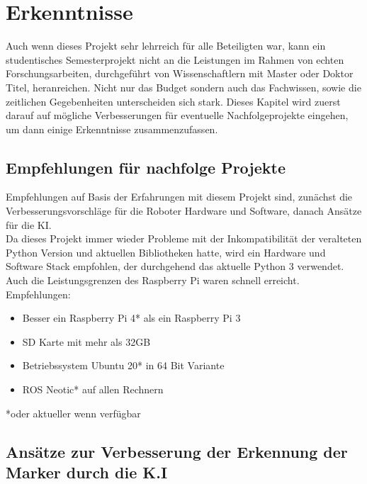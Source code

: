 \documentclass[conference]{IEEEtran}
\begin{document}

	\section{Erkenntnisse }
	Auch wenn dieses Projekt sehr lehrreich für alle Beteiligten war, kann ein studentisches Semesterprojekt nicht an die Leistungen im Rahmen von echten Forschungsarbeiten, durchgeführt von Wissenschaftlern mit Master oder Doktor Titel, heranreichen. Nicht nur das Budget sondern auch das Fachwissen, sowie die zeitlichen Gegebenheiten unterscheiden sich stark. Dieses Kapitel wird zuerst darauf auf mögliche Verbesserungen für eventuelle Nachfolgeprojekte eingehen, um dann einige Erkenntnisse zusammenzufassen. 
	
	\subsection{Empfehlungen für nachfolge Projekte}
	
	Empfehlungen auf Basis der Erfahrungen mit diesem Projekt sind, zunächst die Verbesserungsvorschläge für die Roboter Hardware und Software, danach Ansätze für die KI.\\
	Da dieses Projekt immer wieder Probleme mit der Inkompatibilität der veralteten Python Version und aktuellen Bibliotheken hatte, wird ein Hardware und Software Stack empfohlen, der durchgehend das aktuelle Python 3 verwendet. Auch die Leistungsgrenzen des Raspberry Pi waren schnell erreicht. \\
	
	Empfehlungen:
	\begin{itemize}
		\item  Besser ein Raspberry Pi 4* als ein Raspberry Pi 3
		\item  SD Karte mit mehr als 32GB
		\item Betriebssystem Ubuntu 20* in 64 Bit Variante
		\item  ROS Neotic* auf allen Rechnern
	\end{itemize}
	*oder aktueller wenn verfügbar
	\subsection{Ansätze zur Verbesserung der Erkennung der Marker durch die K.I}
	
\end{document}
